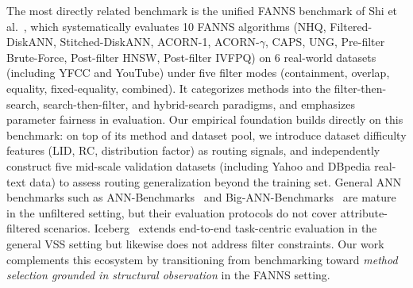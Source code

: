 The most directly related benchmark is the unified FANNS benchmark of Shi et al.~\cite{FilteredANNBenchmark2024}, which systematically evaluates 10 FANNS algorithms (NHQ, Filtered-DiskANN, Stitched-DiskANN, ACORN-1, ACORN-$\gamma$, CAPS, UNG, Pre-filter Brute-Force, Post-filter HNSW, Post-filter IVFPQ) on 6 real-world datasets (including YFCC and YouTube) under five filter modes (containment, overlap, equality, fixed-equality, combined). It categorizes methods into the filter-then-search, search-then-filter, and hybrid-search paradigms, and emphasizes parameter fairness in evaluation. Our empirical foundation builds directly on this benchmark: on top of its method and dataset pool, we introduce dataset difficulty features (LID, RC, distribution factor) as routing signals, and independently construct five mid-scale validation datasets (including Yahoo and DBpedia real-text data) to assess routing generalization beyond the training set.
General ANN benchmarks such as ANN-Benchmarks~\cite{ANNBenchmarks2020} and Big-ANN-Benchmarks~\cite{simhadri2022bigann} are mature in the unfiltered setting, but their evaluation protocols do not cover attribute-filtered scenarios. Iceberg~\cite{Iceberg} extends end-to-end task-centric evaluation in the general VSS setting but likewise does not address filter constraints. Our work complements this ecosystem by transitioning from benchmarking toward \emph{method selection grounded in structural observation} in the FANNS setting.